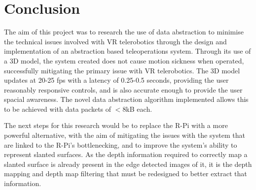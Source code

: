 \chapter{Conclusion}
\label{chapter:conclusion}

The aim of this project was to research the use of data abstraction to minimise the technical issues involved with VR telerobotics through the design and implementation of an abstraction based teleoperations system. Through its use of a 3D model, the system created does not cause motion sickness when operated, successfully mitigating the primary issue with VR telerobotics. The 3D model updates at 20-25 fps with a latency of 0.25-0.5 seconds, providing the user reasonably responsive controls, and is also accurate enough to provide the user spacial awareness. The novel data abstraction algorithm implemented allows this to be achieved with data packets of $<$8kB each.

The next steps for this research would be to replace the R-Pi with a more powerful alternative, with the aim of mitigating the issues with the system that are linked to the R-Pi's bottlenecking, and to improve the system's ability to represent slanted surfaces. As the depth information required to correctly map a slanted surface is already present in the edge detected images of it, it is the depth mapping and depth map filtering that must be redesigned to better extract that information.